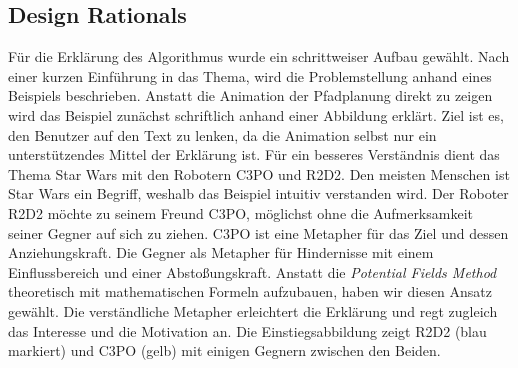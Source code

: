 \subsection{Design Rationals}
Für die Erklärung des Algorithmus wurde ein schrittweiser Aufbau gewählt. Nach einer kurzen Einführung in das Thema, wird die Problemstellung anhand eines Beispiels beschrieben. Anstatt die Animation der Pfadplanung direkt zu zeigen wird das Beispiel zunächst schriftlich anhand einer Abbildung erklärt. Ziel ist es, den Benutzer auf den Text zu lenken, da die Animation selbst nur ein unterstützendes Mittel der Erklärung ist.
Für ein besseres Verständnis dient das Thema Star Wars mit den Robotern C3PO und R2D2. Den meisten Menschen ist Star Wars ein Begriff, weshalb das Beispiel intuitiv verstanden wird. Der Roboter R2D2 möchte zu seinem Freund C3PO, möglichst ohne die Aufmerksamkeit seiner Gegner auf sich zu ziehen.
C3PO ist eine Metapher für das Ziel und dessen Anziehungskraft. Die Gegner als Metapher für Hindernisse mit einem Einflussbereich und einer Abstoßungskraft.
Anstatt die \textit{Potential Fields Method} theoretisch mit mathematischen Formeln aufzubauen, haben wir diesen Ansatz gewählt. Die verständliche Metapher erleichtert die Erklärung und regt zugleich das Interesse und die Motivation an.
Die Einstiegsabbildung zeigt R2D2 (blau markiert) und C3PO (gelb) mit einigen Gegnern zwischen den Beiden.


